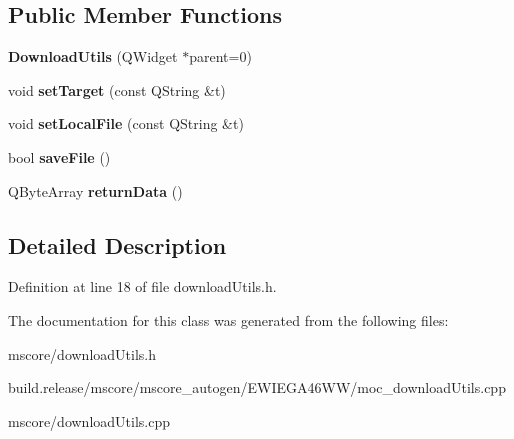 \subsection*{Public Member Functions}
\begin{DoxyCompactItemize}
\item 
\mbox{\label{class_ms_1_1_download_utils_a4c21be8a7a0ab77c2a61d3cfb67aa9e4}} 
{\bfseries Download\+Utils} (Q\+Widget $\ast$parent=0)
\item 
\mbox{\label{class_ms_1_1_download_utils_a1ed2ea34416a1a321f715fadcb2ed79c}} 
void {\bfseries set\+Target} (const Q\+String \&t)
\item 
\mbox{\label{class_ms_1_1_download_utils_aa88dffc668943bddaf8049efb935cbf0}} 
void {\bfseries set\+Local\+File} (const Q\+String \&t)
\item 
\mbox{\label{class_ms_1_1_download_utils_aa220e5c1dbfc2b10b3f7f79d51cce618}} 
bool {\bfseries save\+File} ()
\item 
\mbox{\label{class_ms_1_1_download_utils_af7a0b3441b05a793cb11caa6a9ab4f82}} 
Q\+Byte\+Array {\bfseries return\+Data} ()
\end{DoxyCompactItemize}


\subsection{Detailed Description}


Definition at line 18 of file download\+Utils.\+h.



The documentation for this class was generated from the following files\+:\begin{DoxyCompactItemize}
\item 
mscore/download\+Utils.\+h\item 
build.\+release/mscore/mscore\+\_\+autogen/\+E\+W\+I\+E\+G\+A46\+W\+W/moc\+\_\+download\+Utils.\+cpp\item 
mscore/download\+Utils.\+cpp\end{DoxyCompactItemize}
